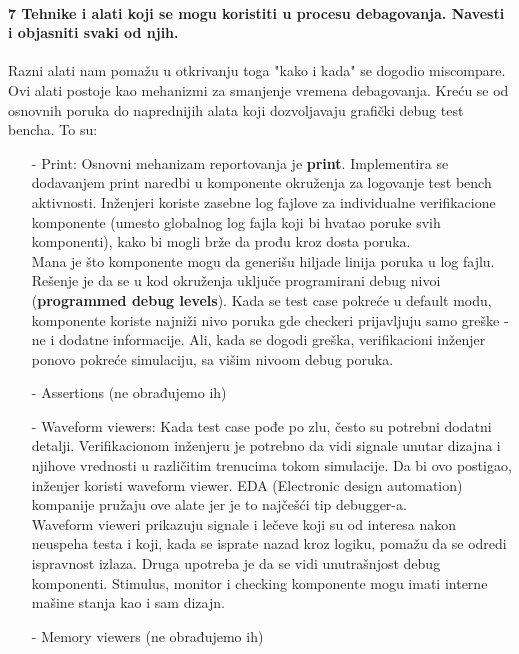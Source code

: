 \documentclass[a4paper, 12pt]{article}
\begin{document}
\paragraph{7 Tehnike i alati koji se mogu koristiti u procesu debagovanja. Navesti i objasniti svaki od njih.}
\hfill \break
\indent Razni alati nam pomažu u otkrivanju toga "kako i kada" se dogodio miscompare. Ovi alati postoje kao mehanizmi za smanjenje vremena debagovanja. Kreću se od osnovnih poruka do naprednijih alata koji dozvoljavaju grafički debug test bencha. To su:
\begin{itemize}
\item[-] Print: 
Osnovni mehanizam reportovanja je \textbf{print}. Implementira se dodavanjem print naredbi u komponente okruženja za logovanje test bench aktivnosti. Inženjeri koriste zasebne log fajlove za individualne verifikacione komponente (umesto globalnog log fajla koji bi hvatao poruke svih komponenti), kako bi mogli brže da prođu kroz dosta poruka.\\
Mana je što komponente mogu da generišu hiljade linija poruka u log fajlu. Rešenje je da se u kod okruženja uključe programirani debug nivoi (\textbf{programmed debug levels}). Kada se test case pokreće u default modu, komponente koriste najniži nivo poruka gde checkeri prijavljuju samo greške - ne i dodatne informacije. Ali, kada se dogodi greška, verifikacioni inženjer ponovo pokreće simulaciju, sa višim nivoom debug poruka.
\item[-] Assertions (ne obrađujemo ih)
\item[-] Waveform viewers: 
Kada test case pođe po zlu, često su potrebni dodatni detalji. Verifikacionom inženjeru je potrebno da vidi signale unutar dizajna i njihove vrednosti u različitim trenucima tokom simulacije. Da bi ovo postigao, inženjer koristi waveform viewer. EDA (Electronic design automation) kompanije pružaju ove alate jer je to najčešći tip debugger-a.\\
Waveform vieweri prikazuju signale i lečeve koji su od interesa nakon neuspeha testa i koji, kada se isprate nazad kroz logiku, pomažu da se odredi ispravnost  izlaza. Druga upotreba je da se vidi unutrašnjost debug komponenti. Stimulus, monitor i checking komponente mogu imati interne mašine stanja kao i sam dizajn. 
\item[-] Memory viewers (ne obrađujemo ih)
\end{itemize}
\end{document}

